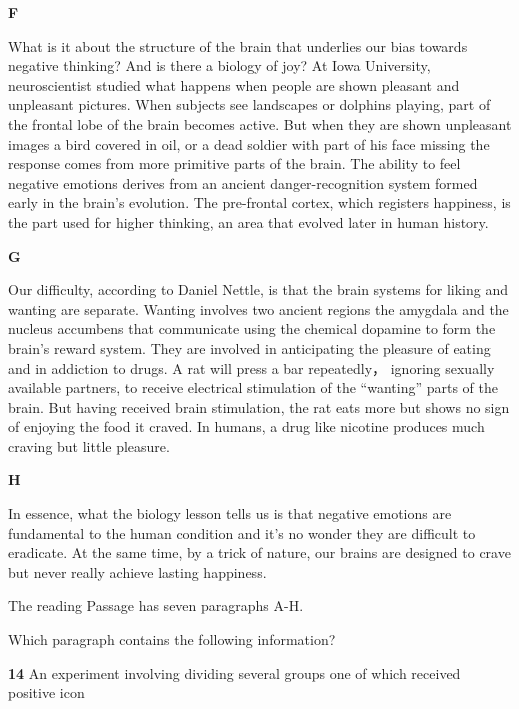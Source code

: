 \documentclass{../templateReading/cdreading}
\begin{document}
\textbf{F}\par

What is it about the structure of the brain that underlies our bias towards negative thinking? And is there a biology of joy? At Iowa University, neuroscientist studied what happens when people are shown pleasant and unpleasant pictures. When subjects see landscapes or dolphins playing, part of the frontal lobe of the brain becomes active. But when they are shown unpleasant images a bird covered in oil, or a dead soldier with part of his face missing the response comes from more primitive parts of the brain. The ability to feel negative emotions derives from an ancient danger-recognition system formed early in the brain’s evolution. The pre-frontal cortex, which registers happiness, is the part used for higher thinking, an area that evolved later in human history.

\textbf{G}\par

Our difficulty, according to Daniel Nettle, is that the brain systems for liking and wanting are separate. Wanting involves two ancient regions the amygdala and the nucleus accumbens that communicate using the chemical dopamine to form the brain’s reward system. They are involved in anticipating the pleasure of eating and in addiction to drugs. A rat will press a bar repeatedly， ignoring sexually available partners, to receive electrical stimulation of the “wanting” parts of the brain. But having received brain stimulation, the rat eats more but shows no sign of enjoying the food it craved. In humans, a drug like nicotine produces much craving but little pleasure.

\textbf{H}\par

In essence, what the biology lesson tells us is that negative emotions are fundamental to the human condition and it’s no wonder they are difficult to eradicate. At the same time, by a trick of nature, our brains are designed to crave but never really achieve lasting happiness.


The reading Passage has seven paragraphs A-H.

Which paragraph contains the following information?


\textbf{14} An experiment involving dividing several groups one of which received positive icon
\end{document}
